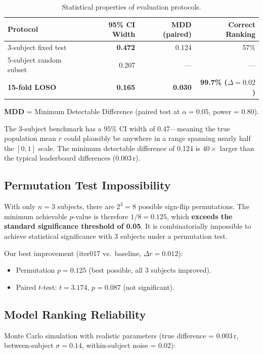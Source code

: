 \documentclass[11pt,a4paper]{article}
\begin{document}
\begin{table}[H]
\centering
\caption{Statistical properties of evaluation protocols.}
\begin{tabular}{lrrr}
\toprule
Protocol & 95\% CI Width & MDD (paired) & Correct Ranking \\
\midrule
3-subject fixed test & \textbf{0.472} & 0.124 & 57\% \\
5-subject random subset & 0.207 & --- & --- \\
\textbf{15-fold LOSO} & \textbf{0.165} & \textbf{0.030} & \textbf{99.7\% ($\Delta = 0.02$)} \\
\bottomrule
\end{tabular}
\end{table}

\textbf{MDD} = Minimum Detectable Difference (paired test at $\alpha = 0.05$,
power = 0.80).

The 3-subject benchmark has a 95\% CI width of 0.47---meaning the true
population mean $r$ could plausibly be anywhere in a range spanning nearly
half the $[0, 1]$ scale. The minimum detectable difference of 0.124 is
$40\times$ larger than the typical leaderboard differences (0.003\,r).

\subsection{Permutation Test Impossibility}

With only $n = 3$ subjects, there are $2^3 = 8$ possible sign-flip
permutations. The minimum achievable $p$-value is therefore
$1/8 = 0.125$, which \textbf{exceeds the standard significance threshold
of 0.05}. It is combinatorially impossible to achieve statistical
significance with 3 subjects under a permutation test.

Our best improvement (iter017 vs.\ baseline, $\Delta r = 0.012$):
\begin{itemize}
  \item Permutation $p = 0.125$ (best possible, all 3 subjects improved).
  \item Paired $t$-test: $t = 3.174$, $p = 0.087$ (not significant).
\end{itemize}

\subsection{Model Ranking Reliability}

Monte Carlo simulation with realistic parameters (true difference =
0.003\,r, between-subject $\sigma = 0.14$, within-subject noise = 0.02):
\end{document}

